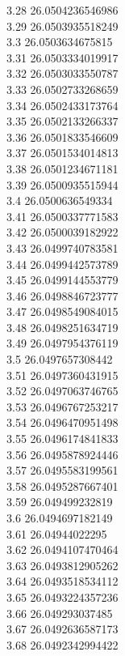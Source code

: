 {3.28	26.0504236546986\\
3.29	26.0503935518249\\
3.3	26.0503634675815\\
3.31	26.0503334019917\\
3.32	26.0503033550787\\
3.33	26.0502733268659\\
3.34	26.0502433173764\\
3.35	26.0502133266337\\
3.36	26.0501833546609\\
3.37	26.0501534014813\\
3.38	26.0501234671181\\
3.39	26.0500935515944\\
3.4	26.0500636549334\\
3.41	26.0500337771583\\
3.42	26.0500039182922\\
3.43	26.0499740783581\\
3.44	26.0499442573789\\
3.45	26.0499144553779\\
3.46	26.0498846723777\\
3.47	26.0498549084015\\
3.48	26.0498251634719\\
3.49	26.0497954376119\\
3.5	26.0497657308442\\
3.51	26.0497360431915\\
3.52	26.0497063746765\\
3.53	26.0496767253217\\
3.54	26.0496470951498\\
3.55	26.0496174841833\\
3.56	26.0495878924446\\
3.57	26.0495583199561\\
3.58	26.0495287667401\\
3.59	26.049499232819\\
3.6	26.0494697182149\\
3.61	26.04944022295\\
3.62	26.0494107470464\\
3.63	26.0493812905262\\
3.64	26.0493518534112\\
3.65	26.0493224357236\\
3.66	26.049293037485\\
3.67	26.0492636587173\\
3.68	26.0492342994422\\
}
